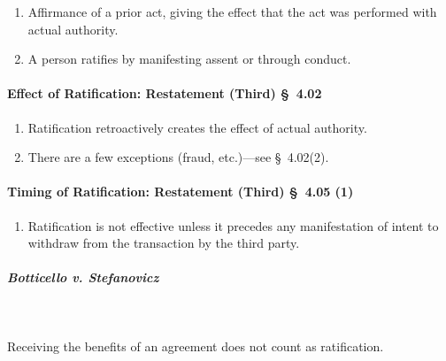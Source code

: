 \begin{enumerate}
    \item Affirmance of a prior act, giving the effect that the act was 
    performed with actual authority.
    \item A person ratifies by manifesting assent or through conduct.
\end{enumerate}

\paragraph{Effect of Ratification: Restatement (Third) \S\ 4.02}

\begin{enumerate}
    \item Ratification retroactively creates the effect of actual authority.
    \item There are a few exceptions (fraud, etc.)---see \S\ 4.02(2).
\end{enumerate}

\paragraph{Timing of Ratification: Restatement (Third) \S\ 4.05 (1)}

\begin{enumerate}
    \item Ratification is not effective unless it precedes any manifestation 
    of intent to withdraw from the transaction by the third party.
\end{enumerate}

\paragraph{\emph{Botticello v. Stefanovicz}}
\label{par:botticello}
~\\\\
Receiving the benefits of an agreement does not count as ratification.

